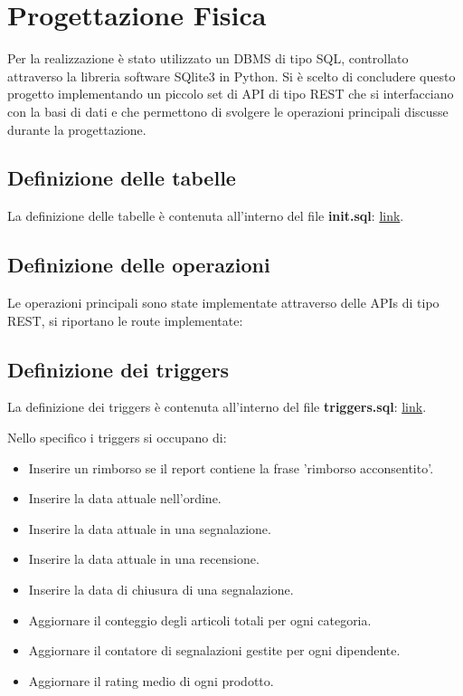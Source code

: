 \section{Progettazione Fisica}

Per la realizzazione è stato utilizzato un DBMS di tipo SQL, controllato attraverso la libreria software SQlite3 in Python. Si è scelto di concludere questo progetto implementando un piccolo set di API di tipo REST che si interfacciano con la basi di dati e che permettono di svolgere le operazioni principali discusse durante la progettazione. 

\subsection{Definizione delle tabelle}
La definizione delle tabelle è contenuta all'interno del file \textbf{init.sql}: \href{https://github.com/krosspile/ecommerce_database/blob/master/src/database/init.sql}{link}.

\subsection{Definizione delle operazioni}

Le operazioni principali sono state implementate attraverso delle APIs di tipo REST, si riportano le route implementate:




\subsection{Definizione dei triggers}

La definizione dei triggers è contenuta all'interno del file \textbf{triggers.sql}: \href{https://github.com/krosspile/ecommerce_database/blob/master/src/database/triggers.sql}{link}.

Nello specifico i triggers si occupano di:\\
\begin{itemize}
    \item Inserire un rimborso se il report contiene la frase 'rimborso acconsentito'.
    \item Inserire la data attuale nell'ordine.
    \item Inserire la data attuale in una segnalazione.
    \item Inserire la data attuale in una recensione.
    \item Inserire la data di chiusura di una segnalazione.
    \item Aggiornare il conteggio degli articoli totali per ogni categoria.
    \item Aggiornare il contatore di segnalazioni gestite per ogni dipendente.
    \item Aggiornare il rating medio di ogni prodotto.
\end{itemize}

